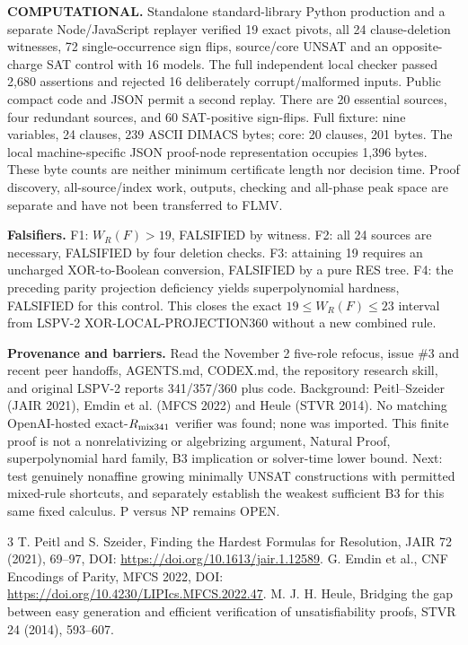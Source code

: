 \documentclass[11pt]{article}
\begin{document}
\noindent\textbf{COMPUTATIONAL.} Standalone standard-library Python production and a separate Node/JavaScript replayer verified 19 exact pivots, all 24 clause-deletion witnesses, 72 single-occurrence sign flips, source/core UNSAT and an opposite-charge SAT control with 16 models. The full independent local checker passed 2,680 assertions and rejected 16 deliberately corrupt/malformed inputs. Public compact code and JSON permit a second replay. There are 20 essential sources, four redundant sources, and 60 SAT-positive sign-flips. Full fixture: nine variables, 24 clauses, 239 ASCII DIMACS bytes; core: 20 clauses, 201 bytes. The local machine-specific JSON proof-node representation occupies 1,396 bytes. These byte counts are neither minimum certificate length nor decision time. Proof discovery, all-source/index work, outputs, checking and all-phase peak space are separate and have not been transferred to FLMV.

\noindent\textbf{Falsifiers.} F1: $W_R(F)>19$, FALSIFIED by witness. F2: all 24 sources are necessary, FALSIFIED by four deletion checks. F3: attaining 19 requires an uncharged XOR-to-Boolean conversion, FALSIFIED by a pure RES tree. F4: the preceding parity projection deficiency yields superpolynomial hardness, FALSIFIED for this control. This closes the exact $19\le W_R(F)\le23$ interval from LSPV-2 XOR-LOCAL-PROJECTION360 without a new combined rule.

\noindent\textbf{Provenance and barriers.} Read the November 2 five-role refocus, issue \#3 and recent peer handoffs, AGENTS.md, CODEX.md, the repository research skill, and original LSPV-2 reports 341/357/360 plus code. Background: Peitl--Szeider (JAIR 2021), Emdin et al. (MFCS 2022) and Heule (STVR 2014). No matching OpenAI-hosted exact-$R_{\rm mix341}$ verifier was found; none was imported. This finite proof is not a nonrelativizing or algebrizing argument, Natural Proof, superpolynomial hard family, B3 implication or solver-time lower bound. Next: test genuinely nonaffine growing minimally UNSAT constructions with permitted mixed-rule shortcuts, and separately establish the weakest sufficient B3 for this same fixed calculus. P versus NP remains OPEN.
\begin{thebibliography}{3}
 T. Peitl and S. Szeider, Finding the Hardest Formulas for Resolution, JAIR 72 (2021), 69--97, DOI: \url{https://doi.org/10.1613/jair.1.12589}.
 G. Emdin et al., CNF Encodings of Parity, MFCS 2022, DOI: \url{https://doi.org/10.4230/LIPIcs.MFCS.2022.47}.
 M. J. H. Heule, Bridging the gap between easy generation and efficient verification of unsatisfiability proofs, STVR 24 (2014), 593--607.
\end{thebibliography}
\end{document}
